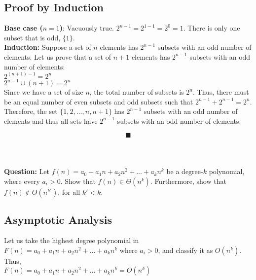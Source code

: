 \documentclass[a4paper,12pt]{article}
\begin{document}
\subsection{Proof by Induction} 

\textbf{Base case ($n=1$)}: Vacuously true. $2^{n-1} = 2^{1-1} = 2^0 = 1$. There is only one subset that is odd, $\{1\}$.\\

\textbf{Induction:} Suppose a set of $n$ elements has $2^{n-1}$ subsets with an odd number of elements. Let us prove that a set of $n+1$ elements has $2^{n-1}$ subsets with an odd number of elements:\\

$2^{(n+1)-1}=2^{n}$\\

$2^{n-1}\cup (n+1) = 2^n$\\

Since we have a set of size $n$, the total number of subsets is $2^n$. Thus, there must be an equal number of even subsets and odd subsets such that $2^{n-1}+2^{n-1}=2^n$.\\

Therefore, the set $\{1, 2, \ldots, n, n+1\}$ has $2^{n-1}$ subsets with an odd number of elements and thus all sets have $2^{n-1}$ subsets with an odd number of elements.

$$\blacksquare$$\\

\section{}

\textbf{Question:}  Let $f(n) = a_{0} + a_{1} n + a_{2} n^{2} +
  \ldots + a_{k} n^{k}$ be a degree-$k$ polynomial, where every $a_{i} >
  0$. Show that $f(n) \in \Theta(n^{k})$. 
  Furthermore, show that $f(n) \notin O(n^{k\prime})$, for all $k\prime < k$.\\

\subsection{Asymptotic Analysis}

Let us take the highest degree polynomial in $F(n) = a_0+a_1n+a_2n^2+\ldots + a_kn^k$ where $a_i > 0$, and classify it as $O(n^k)$. Thus,\\

$F(n) = a_0+a_1n+a_2n^2+\ldots + a_kn^k = O(n^k)$\\
\end{document}
